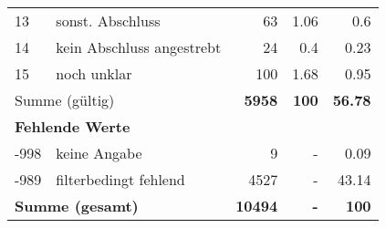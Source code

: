\begin{longtable}{lXrrr}
     13 &
     \multicolumn{1}{X}{ sonst. Abschluss   } &


       \num{63} &
       \num[round-mode=places,round-precision=2]{1,06} &
         \num[round-mode=places,round-precision=2]{0,6} \\

     14 &
     \multicolumn{1}{X}{ kein Abschluss angestrebt   } &


       \num{24} &
       \num[round-mode=places,round-precision=2]{0,4} &
         \num[round-mode=places,round-precision=2]{0,23} \\

     15 &
     \multicolumn{1}{X}{ noch unklar   } &


       \num{100} &
       \num[round-mode=places,round-precision=2]{1,68} &
         \num[round-mode=places,round-precision=2]{0,95} \\
     \midrule
     \multicolumn{2}{l}{Summe (gültig)} &
       \textbf{\num{5958}} &
     \textbf{100} &
       \textbf{\num[round-mode=places,round-precision=2]{56,78}} \\
     \multicolumn{5}{l}{\textbf{Fehlende Werte}}\\
       -998 &
       keine Angabe &
         \num{9} &
        - &
         \num[round-mode=places,round-precision=2]{0,09} \\
       -989 &
       filterbedingt fehlend &
         \num{4527} &
        - &
         \num[round-mode=places,round-precision=2]{43,14} \\
     \midrule
     \multicolumn{2}{l}{\textbf{Summe (gesamt)}} &
          \textbf{\num{10494}} &
        \textbf{-} &
        \textbf{100} \\
     \bottomrule
     \end{longtable}
     
